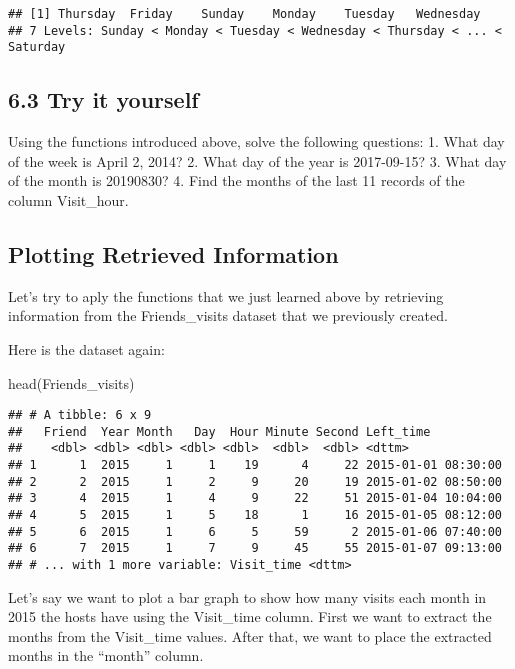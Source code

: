 \documentclass[
]{book}
\newenvironment{Shaded}{\begin{snugshade}}{\end{snugshade}}
\newcommand{\FunctionTok}[1]{\textcolor[rgb]{0.00,0.00,0.00}{#1}}
\newcommand{\NormalTok}[1]{#1}
\begin{document}
\begin{verbatim}
## [1] Thursday  Friday    Sunday    Monday    Tuesday   Wednesday
## 7 Levels: Sunday < Monday < Tuesday < Wednesday < Thursday < ... < Saturday
\end{verbatim}

\hypertarget{try-it-yourself-30}{%
\subsection{6.3 Try it yourself}\label{try-it-yourself-30}}

Using the functions introduced above, solve the following questions:
1. What day of the week is April 2, 2014?
2. What day of the year is 2017-09-15?
3. What day of the month is 20190830?
4. Find the months of the last 11 records of the column Visit\_hour.

\hypertarget{plotting-retrieved-information}{%
\subsection{Plotting Retrieved Information}\label{plotting-retrieved-information}}

Let's try to aply the functions that we just learned above by retrieving information from the Friends\_visits dataset that we previously created.

Here is the dataset again:

\begin{Shaded}
\begin{Highlighting}[]
\FunctionTok{head}\NormalTok{(Friends\_visits)}
\end{Highlighting}
\end{Shaded}

\begin{verbatim}
## # A tibble: 6 x 9
##   Friend  Year Month   Day  Hour Minute Second Left_time
##    <dbl> <dbl> <dbl> <dbl> <dbl>  <dbl>  <dbl> <dttm>
## 1      1  2015     1     1    19      4     22 2015-01-01 08:30:00
## 2      2  2015     1     2     9     20     19 2015-01-02 08:50:00
## 3      4  2015     1     4     9     22     51 2015-01-04 10:04:00
## 4      5  2015     1     5    18      1     16 2015-01-05 08:12:00
## 5      6  2015     1     6     5     59      2 2015-01-06 07:40:00
## 6      7  2015     1     7     9     45     55 2015-01-07 09:13:00
## # ... with 1 more variable: Visit_time <dttm>
\end{verbatim}

Let's say we want to plot a bar graph to show how many visits each month in 2015 the hosts have using the Visit\_time column. First we want to extract the months from the Visit\_time values. After that, we want to place the extracted months in the ``month'' column.
\end{document}
